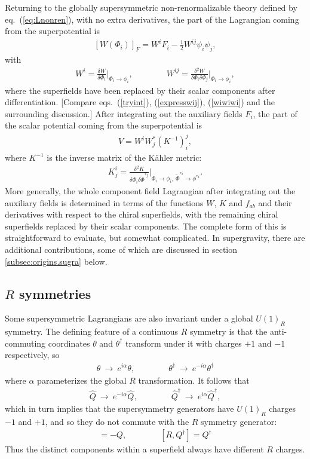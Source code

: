 \documentclass[12pt]{article}
\def\beq{\begin{eqnarray}}
\def\eeq{\end{eqnarray}}
\begin{document}
Returning to the globally supersymmetric non-renormalizable theory defined 
by eq.~(\ref{eq:Lnonren}), with no extra derivatives,
the part of the Lagrangian coming from the superpotential is
\beq
\left [ W(\Phi_i) \right ]_F = W^i F_i  - \frac{1}{2} W^{ij} \psi_i \psi_j ,
\eeq
with
\beq
W^i = \frac{\delta W}{\delta\Phi_i} 
\biggl |_{\Phi_i \rightarrow \phi_i},
\qquad\qquad
W^{ij} = \frac{\delta^{2} W}{\delta\Phi_i\delta \Phi_j}
\biggl |_{\Phi_i \rightarrow \phi_i}
,
\eeq
where the superfields have been replaced by their scalar components after 
differentiation.
[Compare eqs.~(\ref{tryint}), (\ref{expresswij}), (\ref{wiwiwi}) and the 
surrounding discussion.] After integrating out the auxiliary 
fields $F_i$, the part of the scalar potential coming from the 
superpotential is
\beq
V = W^i W_j^* (K^{-1})_i^j,
\eeq
where $K^{-1}$ is the inverse matrix of the K\"ahler metric:
\beq
K^i_j = \frac{\delta^2 K}{\delta \Phi_i \delta \tilde \Phi^{*j}} \biggl |_{\Phi_i 
\rightarrow \phi_i,\> \tilde \Phi^{*i}
\rightarrow \phi^{*i}}.
\eeq
More generally, the whole component field Lagrangian after integrating 
out the auxiliary fields is determined in 
terms of the functions $W$, $K$ and $f_{ab}$ and their derivatives with 
respect to the chiral superfields, with the remaining chiral superfields
replaced by their scalar components. 
The complete form of this is straightforward to evaluate, but somewhat 
complicated. In supergravity, there are additional contributions, some of 
which are discussed in section \ref{subsec:origins.sugra} below.

\subsection{$R$ symmetries\label{Rsymmetry}}
\setcounter{equation}{0}
\setcounter{footnote}{2}

Some supersymmetric Lagrangians are also invariant under a global 
$U(1)_R$ symmetry. The defining feature of a continuous $R$ symmetry is 
that the anti-commuting coordinates $\theta$ and $\theta^\dagger$ 
transform under it with charges $+1$ and $-1$ respectively, so
\beq
\theta \> \rightarrow \> e^{i \alpha} \theta,
\qquad\qquad
\theta^\dagger \> \rightarrow \> e^{-i \alpha} \theta^\dagger
\label{eq:Rtranstheta}
\eeq
where $\alpha$ parameterizes the global $R$ transformation. It follows that 
\beq
\hat Q \> \rightarrow \> e^{-i \alpha} \hat Q,
\qquad\qquad
\hat Q^\dagger \> \rightarrow \> e^{i \alpha} \hat Q^\dagger,
\eeq
which in turn implies that the supersymmetry generators have 
$U(1)_R$ charges $-1$ and $+1$, and so 
they do not commute
with the $R$ symmetry generator:
\beq
[R, Q] = -Q, \qquad\qquad
[R, Q^\dagger] = Q^\dagger
\eeq
Thus the distinct components within a superfield always have different $R$ charges.
\end{document}
